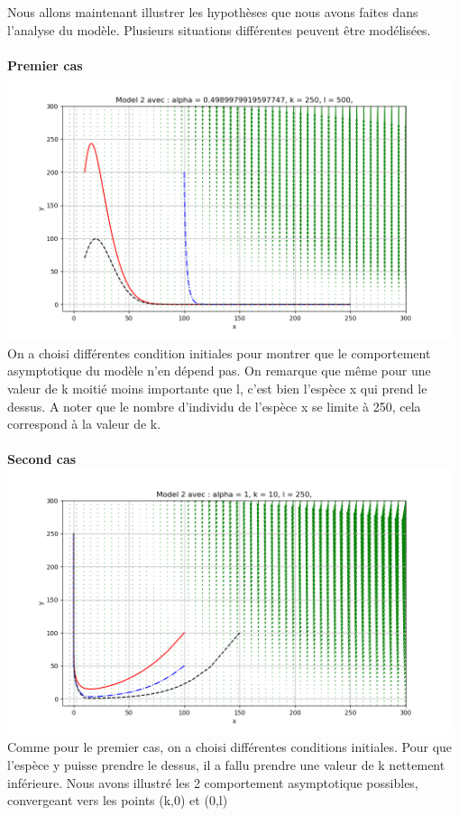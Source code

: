 \documentclass{article}
\begin{document}
Nous allons maintenant illustrer les hypothèses que nous avons faites dans l'analyse du modèle. Plusieurs situations différentes peuvent être modélisées. \\ \\
\textbf{Premier cas}\\
\includegraphics[width = 13cm]{../img/x_predom2.png}\\
On a choisi différentes condition initiales pour montrer que le comportement asymptotique du modèle n'en dépend pas. On remarque que même pour une valeur de k moitié moins importante que l, c'est bien l'espèce x qui prend le dessus. A noter que le nombre d'individu de l'espèce x se limite à 250, cela correspond à la valeur de k.\\ \\
\textbf{Second cas}\\
\includegraphics[width = 13cm]{../img/y_predom2.png}\\
Comme pour le premier cas, on a choisi différentes conditions initiales. Pour que l'espèce y puisse prendre le dessus, il a fallu prendre une valeur de k nettement inférieure. Nous avons illustré les 2 comportement asymptotique possibles, convergeant vers les points (k,0) et (0,l)
\end{document}
